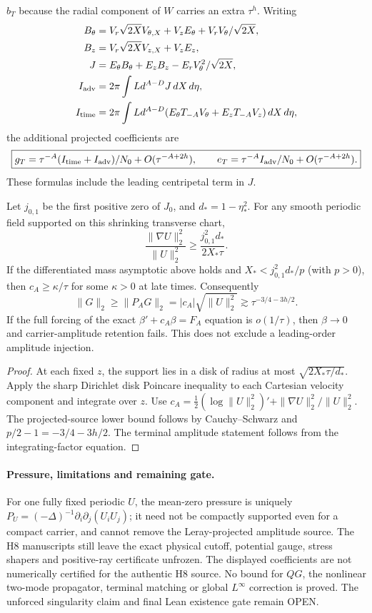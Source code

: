$b_T$ because the radial component of $W$ carries an extra $\tau^h$.
Writing
\begin{align*}
B_\theta&=V_r\sqrt{2X}V_{\theta,X}+V_zE_\theta+V_rV_\theta/\sqrt{2X},\\
B_z&=V_r\sqrt{2X}V_{z,X}+V_zE_z,\\
J&=E_\theta B_\theta+E_z B_z-E_rV_\theta^2/\sqrt{2X},\\
I_{\rm adv}&=2\pi\int Ld^{A-D}J\,dX\,d\eta,\\
I_{\rm time}&=2\pi\int Ld^{A-D}
 (E_\theta T_{-A}V_\theta+E_zT_{-A}V_z)\,dX\,d\eta,
\end{align*}
the additional projected coefficients are
\[
\boxed{g_T=\tau^{-A}(I_{\rm time}+I_{\rm adv})/N_0+
O(\tau^{-A+2h}),\qquad
e_T=\tau^{-A}I_{\rm adv}/N_0+O(\tau^{-A+2h}).}
\]
These formulas include the leading centripetal term in $J$.

\begin{proposition}
Let $j_{0,1}$ be the first positive zero of $J_0$, and
$d_*=1-\eta_*^2$. For any smooth periodic field supported on this
shrinking transverse chart,
\[
\frac{\|\nabla U\|_2^2}{\|U\|_2^2}\ge
\frac{j_{0,1}^2d_*}{2X_*\tau}.
\]
If the differentiated mass asymptotic above holds and
$X_*<j_{0,1}^2d_*/p$ (with $p>0$), then $c_A\ge\kappa/\tau$
for some $\kappa>0$ at late times. Consequently
\[
\boxed{\|G\|_2\ge \|P_A G\|_2=|c_A|\sqrt{\|U\|_2^2}
\gtrsim \tau^{-3/4-3h/2}.}
\]
If the full forcing of the exact $\beta'+c_A\beta=F_A$ equation
is $o(1/\tau)$, then $\beta\to0$ and carrier-amplitude retention
fails. This does not exclude a leading-order amplitude injection.
\end{proposition}
\begin{proof}
At each fixed $z$, the support lies in a disk of radius at most
$\sqrt{2X_*\tau/d_*}$. Apply the sharp Dirichlet disk Poincare
inequality to each Cartesian velocity component and integrate over
$z$. Use
$c_A=\tfrac12(\log\|U\|_2^2)'
+\|\nabla U\|_2^2/\|U\|_2^2$.
The projected-source lower bound follows by Cauchy--Schwarz and
$p/2-1=-3/4-3h/2$. The terminal amplitude statement follows
from the integrating-factor equation.
\end{proof}

\paragraph{Pressure, limitations and remaining gate.}
For one fully fixed periodic $U$, the mean-zero pressure is uniquely
$P_U=(-\Delta)^{-1}\partial_i\partial_j(U_iU_j)$; it need not be
compactly supported even for a compact carrier, and cannot remove
the Leray-projected amplitude source. The H8 manuscripts still leave
the exact physical cutoff, potential gauge, stress shapers and
positive-ray certificate unfrozen. The displayed coefficients are
not numerically certified for the authentic H8 source. No bound for
$QG$, the nonlinear two-mode propagator, terminal matching or
global $L^\infty$ correction is proved. The unforced singularity
claim and final Lean existence gate remain OPEN.

